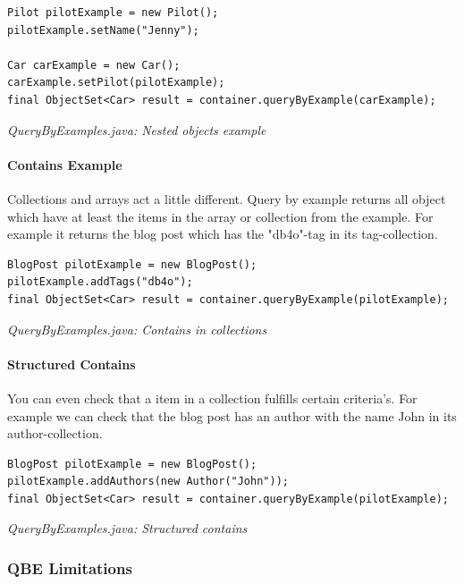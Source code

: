 \begin{lstlisting}
Pilot pilotExample = new Pilot();
pilotExample.setName("Jenny");

Car carExample = new Car();
carExample.setPilot(pilotExample);
final ObjectSet<Car> result = container.queryByExample(carExample);
\end{lstlisting}

{\small\itshape QueryByExamples.java: Nested objects example\par}
\medskip

\paragraph{Contains Example}
\label{ref:basics-querying-query-by-example-qby-examples:contains}

Collections and arrays act a little different. Query by example returns all object which have at least the items in the array or collection from the example. For example it returns the blog post which has the "db4o"-tag in its tag-collection.

\begin{lstlisting}
BlogPost pilotExample = new BlogPost();
pilotExample.addTags("db4o");
final ObjectSet<Car> result = container.queryByExample(pilotExample);
\end{lstlisting}

{\small\itshape QueryByExamples.java: Contains in collections\par}
\medskip

\paragraph{Structured Contains}
\label{ref:basics-querying-query-by-example-qby-examples:structuredcombine}

You can even check that a item in a collection fulfills certain criteria's. For example we can check that the blog post has an author with the name John in its author-collection.

\begin{lstlisting}
BlogPost pilotExample = new BlogPost();
pilotExample.addAuthors(new Author("John"));
final ObjectSet<Car> result = container.queryByExample(pilotExample);
\end{lstlisting}

{\small\itshape QueryByExamples.java: Structured contains\par}
\medskip

\subsubsection{QBE Limitations}
\label{ref:basics-querying-query-by-example-qbe-limitations}


